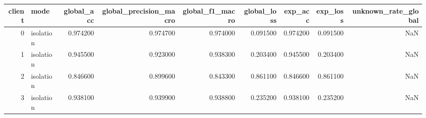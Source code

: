 \begin{tabular}{rlrrrrrrr}
\toprule
client & mode & global_acc & global_precision_macro & global_f1_macro & global_loss & exp_acc & exp_loss & unknown_rate_global \\
\midrule
0 & isolation & 0.974200 & 0.974700 & 0.974000 & 0.091500 & 0.974200 & 0.091500 & NaN \\
1 & isolation & 0.945500 & 0.923000 & 0.938300 & 0.203400 & 0.945500 & 0.203400 & NaN \\
2 & isolation & 0.846600 & 0.899600 & 0.843300 & 0.861100 & 0.846600 & 0.861100 & NaN \\
3 & isolation & 0.938100 & 0.939900 & 0.938800 & 0.235200 & 0.938100 & 0.235200 & NaN \\
\bottomrule
\end{tabular}
